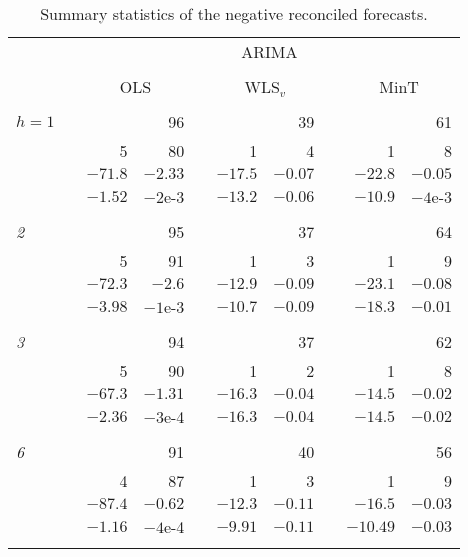 \documentclass[11pt]{article}
\newcommand{\0}{\phantom{0}}
\begin{document}
\begin{table}[ht]
	\centering
	\fontsize{9}{12}\rm\tabcolsep=0.18cm
	\caption{Summary statistics of the negative reconciled forecasts.}
	\label{tbl:summaryneg}
	\begin{threeparttable}
		\begin{tabular}{lrrrrrrrrr}
			\toprule
			& & \multicolumn{8}{c}{ARIMA}\\
			\cline{3-10}\\[-0.3cm]
			& & \multicolumn{2}{c}{OLS} & & \multicolumn{2}{c}{WLS$_{v}$} & & \multicolumn{2}{c}{MinT} \\
			\cline{3-4} \cline{6-7} \cline{9-10} \\[-0.3cm]
			$h = 1$ & & & 96 & & & 39 & & & 61 \\
			& & 5 & 80 & & 1 & 4 & & 1 & 8 \\
			& & $-71.8$ & $-2.33$ & & $-17.5$ & $-0.07$ & & $-22.8$ & $-0.05$ \\
			& & $-1.52$ & $-2$e-3 & & $-13.2$ & $-0.06$ & & $-10.9$ & $-4$e-3 \\ \\[-0.3cm]

			{\it 2} & & & 95 & & & 37 & & & 64 \\
			& & 5 & 91 & & 1 & 3 & & 1 & 9 \\
			& & $-72.3$ & $-2.6$ & & $-12.9$ & $-0.09$ & & $-23.1$ & $-0.08$ \\
			& & $-3.98$ & $-1$e-3 & & $-10.7$ & $-0.09$ & & $-18.3$ & $-0.01$ \\ \\[-0.3cm]

			{\it 3}	& & & 94 & & & 37 & & & 62 \\
			& & 5 & 90 & & 1 & 2 & & 1 & 8 \\
			& & $-67.3$ & $-1.31$ & & $-16.3$ & $-0.04$ & & $-14.5$ & $-0.02$ \\
			& & $-2.36$ & $-3$e-4 & & $-16.3$ & $-0.04$ & & $-14.5$ & $-0.02$ \\ \\[-0.3cm]

			{\it 6} & & & 91 & & & 40 & & & 56 \\
			& & 4 & 87 & & 1 & 3 & & 1 & 9 \\
			& & $-87.4$ & $-0.62$ & & $-12.3$ & $-0.11$ & & $-16.5$ & $-0.03$ \\
			& & $-1.16$ & $-4$e-4 & & $-9.91$ & $-0.11$ & & $-10.49$ & $-0.03$ \\ \\[-0.3cm]


\end{tabular}
\end{threeparttable}
\end{table}
\end{document}
